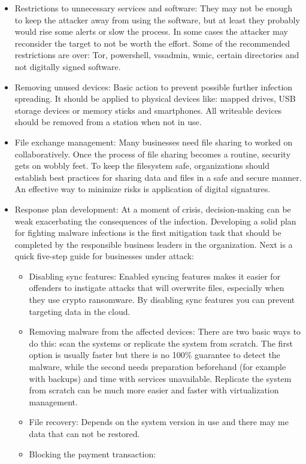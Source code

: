 \begin{itemize}
	\item Restrictions to unnecessary services and software:
They may not be enough to keep the attacker away from using the software, but at least they probably would rise some alerts or slow the process.
In some cases the attacker may reconsider the target to not be worth the effort.
Some of the recommended restrictions are over: Tor, powershell, vssadmin, wmic, certain directories and not digitally signed software.
	\item Removing unused devices:
Basic action to prevent possible further infection spreading.
It should be applied to physical devices like: mapped drives, USB storage devices or memory sticks and smartphones.
All writeable devices should be removed from a station when not in use.
	\item File exchange management:
Many businesses need file sharing to worked on collaboratively.
Once the process of file sharing becomes a routine, security gets on wobbly feet.
To keep the filesystem safe, organizations should establish best practices for sharing data and files in a safe and secure manner.
An effective way to minimize risks is application of digital signatures.
	\item Response plan development:
At a moment of crisis, decision-making can be weak exacerbating the consequences of the infection.
Developing a solid plan for fighting malware infections is the first mitigation task that should be completed by the responsible business leaders in the organization.
\linej
Next is a quick five-step guide for businesses under attack:
	\begin{itemize}
		\item Disabling sync features:
Enabled syncing features makes it easier for offenders to instigate attacks that will overwrite files, especially when they use crypto ransomware.
By disabling sync features you can prevent targeting data in the cloud.
		\item Removing malware from the affected devices:
There are two basic ways to do this: scan the systems or replicate the system from scratch.
The first option is usually faster but there is no 100\% guarantee to detect the malware, while the second needs preparation beforehand (for example with backups) and time with services unavailable.
Replicate the system from scratch can be much more easier and faster with virtualization management.
		\item File recovery:
Depends on the system version in use and there may me data that can not be restored.
		\item Blocking the payment transaction:

\end{itemize}
\end{itemize}
